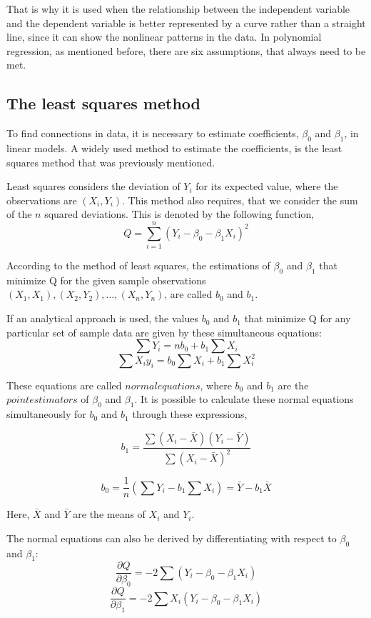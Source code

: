 That is why it is used when the relationship between the independent variable and the dependent variable is better represented by a curve rather than a straight line, since it can show the nonlinear patterns in the data.
In polynomial regression, as mentioned before, there are six assumptions, that always need to be met.

\subsection{The least squares method}
	To find connections in data, it is necessary to estimate coefficients, $\beta_0$ and $\beta_1$, in linear models. 
	A widely used method to estimate the coefficients, is the least squares method that was previously mentioned. 
	
	Least squares considers the deviation of $Y_i$ for  its expected value, where the observations are $(X_i, Y_i)$. 
	This method also requires, that we consider the sum of the $n$ squared deviations.
	This is denoted by the following function,
	$$Q=\sum_{i=1}^{n}(Y_i-\beta_0 - \beta_1 X_i)^2$$
	
	According to the method of least squares, the estimations of $\beta_0$ and $\beta_1$ that minimize Q for the given sample observations $(X_1,X_1), (X_2,Y_2), ..., (X_n,Y_n)$, are called $b_0$ and $b_1$.  
	
	If an analytical approach is used, the values $b_0$ and $b_1$ that minimize Q for any particular set of sample data are given by these simultaneous equations: 
	$$\sum Y_i =n b_0 +b_1 \sum X_i$$
	$$\sum X_i y_i = b_0 \sum X_i + b_1 \sum X_i^2$$
	
	These equations are called $normal  equations$, where $b_0$ and $b_1$ are the $point estimators$ of $\beta_0$ and $\beta_1$. It is possible to calculate these normal equations simultaneously for $b_0$ and $b_1$ through these expressions,
	
	$$b_1 = \frac{\sum (X_i - \bar{X}) (Y_i - \bar{Y})}{\sum (X_i - \bar{X})^2}$$
	
	$$b_0 = \frac{1}{n} (\sum Y_i - b_1 \sum X_i ) = \bar{Y} - b_1 \bar{X}$$
	
	Here, $\bar{X}$ and $\bar{Y}$ are the means of $X_i$ and $Y_i$.
	
	The normal equations can also be derived by differentiating with respect to $\beta_0$ and $\beta_1$:
	$$\frac{\partial Q}{\partial \beta_0}=-2 \sum (Y_i - \beta_0 - \beta_1 X_i)$$
	$$\frac{\partial Q} {\partial \beta_1} = -2 \sum X_i (Y_i - \beta_0 - \beta_1 X_i)$$
	
